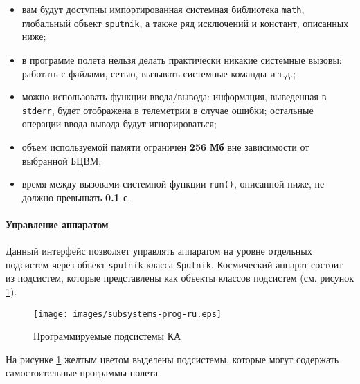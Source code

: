 \documentclass[12pt,a4paper]{article}
\begin{document}
\begin{itemize}
  \item вам будут доступны импортированная системная библиотека \verb'math', глобальный
    объект \verb'sputnik', а также ряд исключений и констант, описанных ниже;
  \item в программе полета нельзя делать практически никакие системные вызовы: работать с
    файлами, сетью, вызывать системные команды и т.д.;
  \item можно использовать функции ввода/вывода: информация, выведенная в \verb'stderr',
    будет отображена в телеметрии в случае ошибки; остальные операции ввода-вывода будут
    игнорироваться;
  \item объем используемой памяти ограничен \textbf{256 Мб} вне зависимости от выбранной БЦВМ;
  \item время между вызовами системной функции \verb'run()', описанной ниже, не должно
    превышать \textbf{0.1 с}.
\end{itemize}

\paragraph{Управление аппаратом}

Данный интерфейс позволяет управлять аппаратом на уровне отдельных подсистем через объект
\verb'sputnik' класса \verb'Sputnik'. Космический аппарат состоит из подсистем, которые представлены как
объекты классов подсистем (см. рисунок \ref{Pic:subsystems-prog}).

\begin{figure}[tbh]
  \begin{center}
    \texttt{[image: images/subsystems-prog-ru.eps]}
    \caption{Программируемые подсистемы КА}
    \label{Pic:subsystems-prog}
  \end{center}
\end{figure}

На рисунке \ref{Pic:subsystems-prog} желтым цветом выделены подсистемы, которые могут содержать
самостоятельные программы полета.
\end{document}
